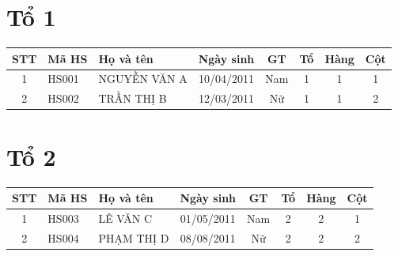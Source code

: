 
\section*{Tổ 1}
\begin{longtable}{|c|l|p{5.2cm}|c|c|c|c|c|}
\hline
STT & Mã HS & Họ và tên & Ngày sinh & GT & Tổ & Hàng & Cột \\
\hline
1 & HS001 & NGUYỄN VĂN A & 10/04/2011 & Nam & 1 & 1 & 1 \\
\hline
2 & HS002 & TRẦN THỊ B & 12/03/2011 & Nữ & 1 & 1 & 2 \\
\hline
\end{longtable}

\section*{Tổ 2}
\begin{longtable}{|c|l|p{5.2cm}|c|c|c|c|c|}
\hline
STT & Mã HS & Họ và tên & Ngày sinh & GT & Tổ & Hàng & Cột \\
\hline
1 & HS003 & LÊ VĂN C & 01/05/2011 & Nam & 2 & 2 & 1 \\
\hline
2 & HS004 & PHẠM THỊ D & 08/08/2011 & Nữ & 2 & 2 & 2 \\
\hline
\end{longtable}

